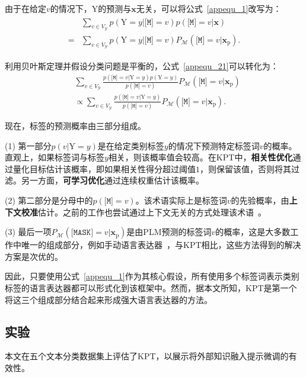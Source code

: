 由于在给定$v$的情况下，Y的预测与$\mathbf{x}$无关，可以将公式~\eqref{appequ_1}改写为：
\begin{align}
\begin{split}
 &\sum_{v\in V_{\mathcal{Y}}} p(\text{Y}=y|\texttt{[M]}\!\!\!=\!v) p(\texttt{[M]}\!\!\!=\!v|\mathbf{x}) \\ 
 = & \sum_{v\in V_{\mathcal{Y}}}  p(\text{Y}=y|\texttt{[M]}\!\!\!=\!v) P_{\mathcal{M}}(\texttt{[M]}\!\!\!=\!v|\mathbf{x}_{\text{p}}).
 \end{split}
\label{appequ_21}
\end{align}

利用贝叶斯定理并假设分类问题是平衡的，公式~\eqref{appequ_21}可以转化为：
\begin{align}\label{appequ_2}
 &\sum_{v\in V_{\mathcal{Y}}} \frac{p(\texttt{[M]}\!\!\!=\!v|\text{Y}=y)p(\text{Y}=y) }{p(\texttt{[M]}\!\!\!=\!v)} P_{\mathcal{M}}(\texttt{[M]}\!\!\!=\!v|\mathbf{x}_{\text{p}})\nonumber\\
 &\propto \!\! \sum_{v\in V_{\mathcal{Y}}}\! \frac{p(\texttt{[M]}\!\!\!=\!v|\text{Y}=y)}{p(\texttt{[M]}\!\!\!=\!v)} P_{\mathcal{M}}(\texttt{[M]}\!\!\!=\!v|\mathbf{x}_{\text{p}}). 
\end{align}

现在，标签的预测概率由三部分组成。

(1) 第一部分$p(v|\text{Y}=y)$是在给定类别标签$y$的情况下预测特定标签词$v$的概率。直观上，如果标签词与标签$y$相关，则该概率值会较高。在KPT中，\textbf{相关性优化}通过量化目标估计该概率，即如果相关性得分超过阈值$1$，则保留该值，否则将其过滤。另一方面，\textbf{可学习优化}通过连续权重估计该概率。

(2) 第二部分是分母中的$p(\texttt{[M]}\!\!\!=\!v)$。该术语实际上是标签词$v$的先验概率，由\textbf{上下文校准}估计。之前的工作也尝试通过上下文无关的方式处理该术语~\cite{holtzman2021surface, pmlr-v139-zhao21c}。

(3) 最后一项$P_{\mathcal{M}}(\texttt{[MASK]}\!\!\!=\!v|\mathbf{x}_{\text{p}})$是由PLM预测的标签词$v$的概率，这是大多数工作中唯一的组成部分，例如手动语言表达器~\cite{schick2020exploiting}，与KPT相比，这些方法得到的解决方案是次优的。

因此，只要使用公式~\eqref{appequ_1}作为其核心假设，所有使用多个标签词表示类别标签的语言表达器都可以形式化到该框架中。然而，据本文所知，KPT是第一个将这三个组成部分结合起来形成强大语言表达器的方法。



\subsection{实验}
本文在五个文本分类数据集上评估了KPT，以展示将外部知识融入提示微调的有效性。

